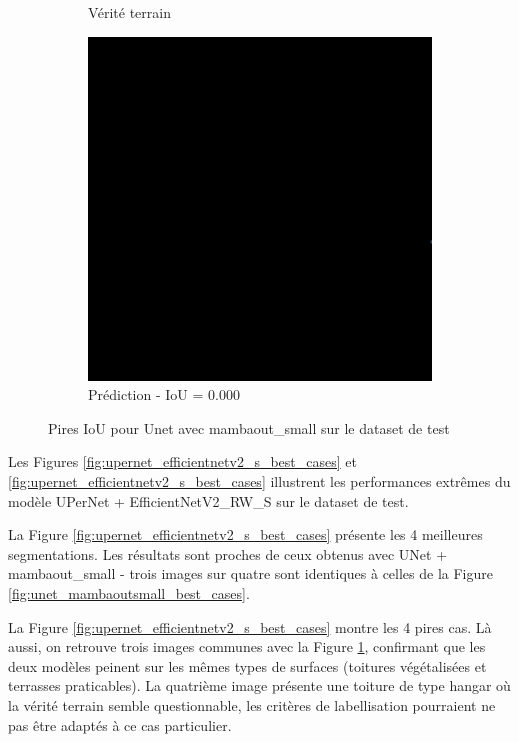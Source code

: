 \begin{figure}[H]
\begin{subfigure}{0.32\textwidth}
    \caption{Vérité terrain}
\end{subfigure}
\hfill
\begin{subfigure}{0.32\textwidth}
    \includegraphics[width=\textwidth]{02-main//figures/ch4/kfold_ensembles/unet_tu-mambaout_small/worst_cases/worst_2_iou0.000_24951112_tile_4_13_2bd653_overlay_pred.png}
    \caption{Prédiction - IoU = 0.000}
\end{subfigure}

\caption{Pires IoU pour Unet avec mambaout\_small sur le dataset de test}
\label{fig:unet_mambaoutsmall_worst_cases}
\end{figure}


Les Figures \ref{fig:upernet_efficientnetv2_s_best_cases} et \ref{fig:upernet_efficientnetv2_s_best_cases} illustrent les performances extrêmes du modèle UPerNet + EfficientNetV2\_RW\_S sur le dataset de test.

La Figure \ref{fig:upernet_efficientnetv2_s_best_cases} présente les 4 meilleures segmentations. Les résultats sont proches de ceux obtenus avec UNet + mambaout\_small - trois images sur quatre sont identiques à celles de la Figure \ref{fig:unet_mambaoutsmall_best_cases}.

La Figure \ref{fig:upernet_efficientnetv2_s_best_cases} montre les 4 pires cas. Là aussi, on retrouve trois images communes avec la Figure \ref{fig:unet_mambaoutsmall_worst_cases}, confirmant que les deux modèles peinent sur les mêmes types de surfaces (toitures végétalisées et terrasses praticables). La quatrième image présente une toiture de type hangar où la vérité terrain semble questionnable, les critères de labellisation pourraient ne pas être adaptés à ce cas particulier.


